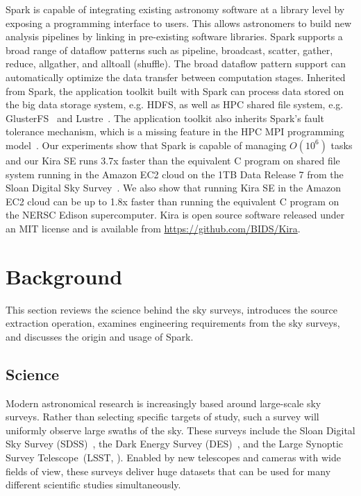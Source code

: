 \documentclass[10pt, conference, compsocconf]{IEEEtran}
\newcommand{\zhaonote}[1]{{\textcolor{cyan}    { ***Zhao:      #1 }}}
\newcommand{\franknote}[1]{{\textcolor{green}    { ***Frank:      #1 }}}
\newcommand{\zhaonote}[1]{}
\newcommand{\franknote}[1]{}
\begin{document}
Spark is capable of integrating existing astronomy software at a library level by exposing a programming interface to users.
This allows astronomers to build new analysis pipelines by linking in pre-existing software libraries.
Spark supports a broad range of dataflow patterns such as pipeline, broadcast, scatter, gather, reduce, allgather, 
and alltoall (shuffle). The broad dataflow pattern support can automatically optimize the data transfer between computation stages.
Inherited from Spark, the application toolkit built with Spark can process data stored on the big data storage system, e.g. HDFS\cite{shvachko10}, 
as well as HPC shared file system, e.g. GlusterFS~\cite{davies13} and Lustre~\cite{donovan03}.
The application toolkit also inherits Spark's fault tolerance mechanism, which is a missing feature in the HPC MPI programming model~\cite{gropp96}.
Our experiments show that Spark is capable of managing $O(10^6)$ tasks and our Kira SE runs 3.7x faster than the equivalent C program on shared file system running in the Amazon EC2 cloud on the 1TB Data Release 7 from the Sloan Digital Sky Survey~\cite{york00}. 
We also show that running Kira SE in the Amazon EC2 cloud can be up to 1.8x faster than running the equivalent C program on the NERSC Edison supercomputer.
Kira is open source software released under an MIT license and is available from \linebreak \url{https://github.com/BIDS/Kira}.



\section{Background}
\label{sec:Background}

This section reviews the science behind the sky surveys, introduces the source extraction operation, examines engineering requirements from the sky surveys, and discusses the origin and usage of Spark.

\subsection{Science}

Modern astronomical research is increasingly based around large-scale sky surveys.
Rather than selecting specific targets of study, such a survey will uniformly observe large
swaths of the sky. These surveys include the Sloan Digital Sky Survey (SDSS)~\cite{york00},
the Dark Energy Survey (DES)~\cite{dark05}, and the Large Synoptic Survey Telescope~(LSST,
\cite{ivezic08}). Enabled by new telescopes and cameras with wide fields of view, these
surveys deliver huge datasets that can be used for many different scientific studies
simultaneously.
\end{document}
